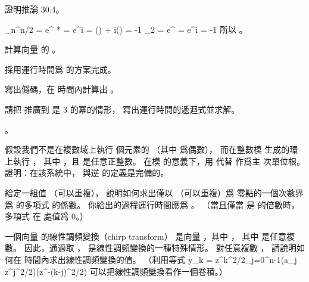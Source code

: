 \startsection[
  title={The DFT and FFT},
  reference=section:dft_fft,
]

\startEXERCISE
證明推論 30.4。
\stopEXERCISE

\startANSWER
\startformula\startmathalignment
\NC \omega_n^{n/2} \NC = e^{ * }
    = e^{\pi i} = \cos(\pi) + i\sin(\pi) = -1 \NR
\NC \omega_2 \NC = e^{} = e^{\pi i} = -1 \NR
\stopmathalignment\stopformula
所以 。
\stopANSWER

\startEXERCISE
計算向量  的 。
\stopEXERCISE

\startANSWER
{}
\stopANSWER

\startEXERCISE
採用運行時間爲  的方案完成。
\stopEXERCISE

\startANSWER
{}
\stopANSWER

\startEXERCISE
寫出僞碼，在  時間內計算出 。
\stopEXERCISE

\startANSWER
{}
\stopANSWER

\startEXERCISE
請把  推廣到  是 3 的冪的情形，
寫出運行時間的遞迴式並求解。
\stopEXERCISE

\startANSWER
{}。
\stopANSWER

\startEXERCISE[exercise:30.2-6]\DIFFICULT
假設我們不是在複數域上執行  個元素的  （其中  爲偶數），
而在整數模  生成的環  上執行 ，
其中 ，且  是任意正整數。
在模  的意義下，用  代替  作爲主  次單位根。
證明：在該系統中，  與逆  的定義是完備的。
\stopEXERCISE

\startANSWER
{}
\stopANSWER

\startEXERCISE
給定一組值  （可以重複），
說明如何求出僅以  （可以重複）爲
零點的一個次數界爲  的多項式  的係數。
你給出的過程運行時間應爲 。
（\hint 當且僅當  是  的倍數時，
多項式  在  處值爲 0。）
\stopEXERCISE

\startANSWER
{}
\stopANSWER

\startEXERCISE\DIFFICULT
一個向量  的{\EMP 線性調頻變換}（chirp transform）
是向量 ，其中 ，
其中  是任意複數。
因此，通過取 ，  是線性調頻變換的一種特殊情形。
對任意複數 ，
請說明如何在  時間內求出線性調頻變換的值。
（\hint 利用等式
\startformula
y_k = z^{k^2/2}\sum_{j=0}^{n-1}(a_j z^{j^2/2})(z^{-(k-j)^2/2})
\stopformula
可以把線性調頻變換看作一個卷積。）
\stopEXERCISE

